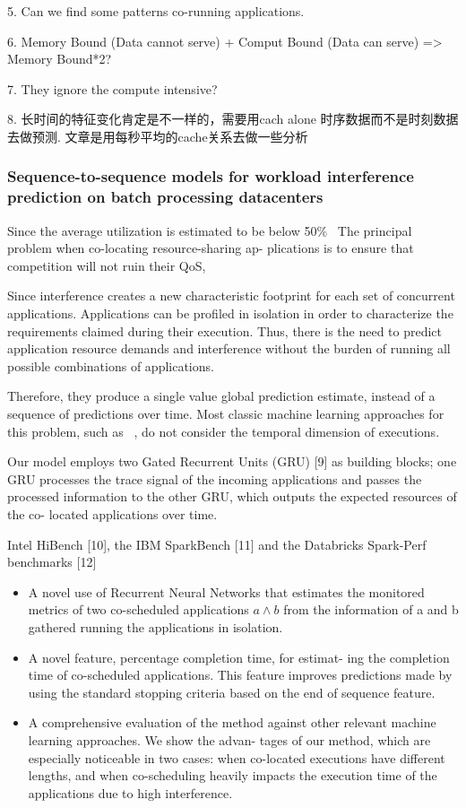 \documentclass[UTF8]{article}
\begin{document}
5. Can we find some patterns co-running applications. 

6. Memory Bound (Data cannot serve) + Comput Bound (Data can serve) => Memory Bound*2? 

7. They ignore the compute intensive?

8. 长时间的特征变化肯定是不一样的，需要用cach alone 时序数据而不是时刻数据去做预测. 文章是用每秒平均的cache关系去做一些分析

\subsubsection{Sequence-to-sequence models for workload interference prediction on batch processing datacenters}

Since the average utilization is estimated to be below 50\%~\cite{barroso2007case, reiss2012heterogeneity} The principal problem when co-locating resource-sharing ap- plications is to ensure that competition will not ruin their QoS,

Since interference creates a new characteristic footprint for each set of concurrent applications. Applications can be profiled in isolation in order to characterize the requirements claimed during their execution. Thus, there is the need to predict application resource demands and interference without the burden of running all possible combinations of applications.

Therefore, they produce a single value global prediction estimate, instead of a sequence of predictions over time. Most classic machine learning approaches for this problem, such as ~\cite{mishra2017esp, delimitrou2013paragon}, do not consider the temporal dimension of executions.

Our model employs two Gated Recurrent Units (GRU) [9] as building blocks; one GRU processes the trace signal of the incoming applications and passes the processed information to the other GRU, which outputs the expected resources of the co- located applications over time.

Intel HiBench [10], the IBM SparkBench [11] and the Databricks Spark-Perf benchmarks [12]

\begin{itemize}
	\item  A novel use of Recurrent Neural Networks that estimates the monitored metrics of two co-scheduled applications $a \wedge b$ from the information of a and b gathered running the applications in isolation.
	\item A novel feature, percentage completion time, for estimat- ing the completion time of co-scheduled applications. This feature improves predictions made by using the standard stopping criteria based on the end of sequence feature.
	\item A comprehensive evaluation of the method against other relevant machine learning approaches. We show the advan- tages of our method, which are especially noticeable in two cases: when co-located executions have different lengths, and when co-scheduling heavily impacts the execution time of the applications due to high interference.
\end{itemize}
\end{document}
